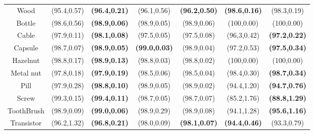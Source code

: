 \documentclass[letterpaper]{article}
\begin{document}
\begin{table*}[t]
\begin{tabular}{c|cccc|cc}
Wood       & \multicolumn{1}{c}{(95.4,0.57)}          & \multicolumn{1}{c|}{\textbf{(96.4,0.21)}} & \multicolumn{1}{c}{(96.1,0.56)} & \multicolumn{1}{c|}{\textbf{(96.2,0.50)}} & \multicolumn{1}{c}{\textbf{(98.6,0.16)}}  & (98.3,0.19)          \\
Bottle     & \multicolumn{1}{c}{(98.6,0.56)}          & \multicolumn{1}{c|}{\textbf{(98.9,0.06)}} & \multicolumn{1}{c}{(98.9,0.05)} & \multicolumn{1}{c|}{(98.9,0.06)}          & \multicolumn{1}{c}{(100,0.00)}   & (100,0.00)           \\
Cable      & \multicolumn{1}{c}{(97.9,0.11)}          & \multicolumn{1}{c|}{\textbf{(98.1,0.08)}} & \multicolumn{1}{c}{(97.5,0.05)} & \multicolumn{1}{c|}{(97.5,0.08)}          & \multicolumn{1}{c}{(96,3,0.42)}  & \textbf{(97.2,0.22)} \\
Capsule    & \multicolumn{1}{c}{(98.7,0.07)} & 
\multicolumn{1}{c|}{\textbf{(98.9,0.05)}}          & \multicolumn{1}{c}{\textbf{(99.0,0.03)}} & \multicolumn{1}{c|}{(98.9,0.04)}          & \multicolumn{1}{c}{(97.2,0.53)}  & \textbf{(97.5,0.34)} \\
Hazelnut   & \multicolumn{1}{c}{(98.8,0.17)}          & \multicolumn{1}{c|}{\textbf{(98.9,0.13)}} & \multicolumn{1}{c}{(98.8,0.03)} & \multicolumn{1}{c|}{(98.8,0.02)}          & \multicolumn{1}{c}{(100,0.00)}   & (100,0.00)           \\
Metal nut  & \multicolumn{1}{c}{(97.8,0.18)}          & \multicolumn{1}{c|}{\textbf{(97.9,0.19)}} & \multicolumn{1}{c}{(98.5,0.06)} & \multicolumn{1}{c|}{(98.5,0.04)}          & \multicolumn{1}{c}{(98.4,0.30)}  & \textbf{(98.7,0.34)} \\
Pill       & \multicolumn{1}{c}{(97.9,0.28)}          & \multicolumn{1}{c|}{\textbf{(98.8,0.10)}} & \multicolumn{1}{c}{(98.9,0.05)} & \multicolumn{1}{c|}{(98.9,0.02)}          & \multicolumn{1}{c}{(94.4,1.20)}  & \textbf{(94.7,0.76)} \\
Screw      & \multicolumn{1}{c}{(99.3,0.15)}          & \multicolumn{1}{c|}{\textbf{(99.4,0.11)}} & \multicolumn{1}{c}{(98.7,0.05)} & \multicolumn{1}{c|}{(98.7,0.07)}          & \multicolumn{1}{c}{(85.2,1.76)}  & \textbf{(88.8,1.29)} \\
ToothBrush & \multicolumn{1}{c}{(98.9,0.09)}          & \multicolumn{1}{c|}{\textbf{(99.0,0.06)}} & \multicolumn{1}{c}{(98.9,0.29)} & \multicolumn{1}{c|}{(98.9,0.08)}          & \multicolumn{1}{c}{(94.1,1.28)}  & \textbf{(95.6,1.16)}          \\
Transistor & \multicolumn{1}{c}{(96.2,1.32)}          & \multicolumn{1}{c|}{\textbf{(96.8,0.21)}} & \multicolumn{1}{c}{(98.0,0.09)} & \multicolumn{1}{c|}{\textbf{(98.1,0.07)}} & \multicolumn{1}{c}{\textbf{(94.4,0.46)}}  & (93.3,0.79)          \\

\end{tabular}
\end{table*}
\end{document}
